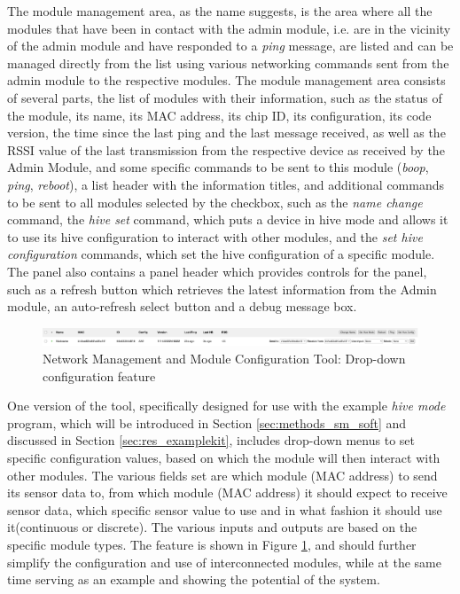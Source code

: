 The module management area, as the name suggests, is the area where all the modules that have been in contact with the admin module, i.e. are in the vicinity of the admin module and have responded to a \textit{ping} message, are listed and can be managed directly from the list using various networking commands sent from the admin module to the respective modules. The module management area consists of several parts, the list of modules with their information, such as the status of the module, its name, its MAC address, its chip ID, its configuration, its code version, the time since the last ping and the last message received, as well as the RSSI value of the last transmission from the respective device as received by the Admin Module, and some specific commands to be sent to this module (\textit{boop}, \textit{ping}, \textit{reboot}), a list header with the information titles, and additional commands to be sent to all modules selected by the checkbox, such as the \textit{name change} command, the \textit{hive set} command, which puts a device in hive mode and allows it to use its hive configuration to interact with other modules, and the \textit{set hive configuration} commands, which set the hive configuration of a specific module. The panel also contains a panel header which provides controls for the panel, such as a refresh button which retrieves the latest information from the Admin module, an auto-refresh select button and a debug message box.

\begin{figure}[H]
    \centering
    \includegraphics[width=\linewidth]{overleaf/images/nmmct_drop.png}
    \vspace{.5\ftspace}
    \caption{Network Management and Module Configuration Tool: Drop-down configuration feature}
    \label{fig:nmmct_drop_met}
\end{figure}

One version of the tool, specifically designed for use with the example \textit{hive mode} program, which will be introduced in Section \ref{sec:methods_sm_soft} and discussed in Section \ref{sec:res_examplekit}, includes drop-down menus to set specific configuration values, based on which the module will then interact with other modules. The various fields set are which module (MAC address) to send its sensor data to, from which module (MAC address) it should expect to receive sensor data, which specific sensor value to use and in what fashion it should use it(continuous or discrete). The various inputs and outputs are based on the specific module types. The feature is shown in Figure \ref{fig:nmmct_drop_met}, and should further simplify the configuration and use of interconnected modules, while at the same time serving as an example and showing the potential of the system.\\

